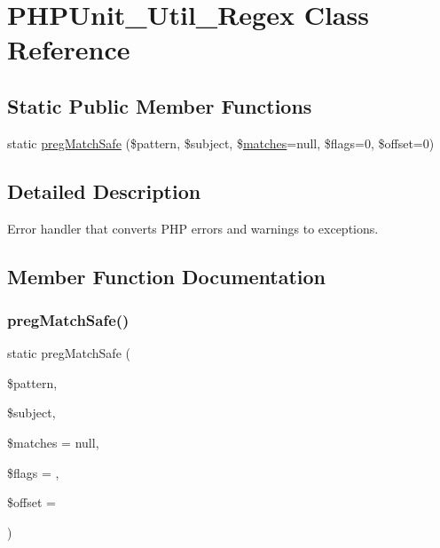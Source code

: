\hypertarget{class_p_h_p_unit___util___regex}{}\section{P\+H\+P\+Unit\+\_\+\+Util\+\_\+\+Regex Class Reference}
\label{class_p_h_p_unit___util___regex}
\subsection*{Static Public Member Functions}
\begin{DoxyCompactItemize}
\item 
static \mbox{\hyperlink{class_p_h_p_unit___util___regex_a0a93507c6a7ffbdaa77544a2077feefe}{preg\+Match\+Safe}} (\$pattern, \$subject, \$\mbox{\hyperlink{_functions_8php_a8968a55c84671473daa2233e6cae65b8}{matches}}=null, \$flags=0, \$offset=0)
\end{DoxyCompactItemize}


\subsection{Detailed Description}
Error handler that converts P\+HP errors and warnings to exceptions. 

\subsection{Member Function Documentation}
\mbox{\label{class_p_h_p_unit___util___regex_a0a93507c6a7ffbdaa77544a2077feefe}} 
\subsubsection{\texorpdfstring{preg\+Match\+Safe()}{pregMatchSafe()}}
{\footnotesize\ttfamily static preg\+Match\+Safe (\begin{DoxyParamCaption}\item[{}]{\$pattern,  }\item[{}]{\$subject,  }\item[{}]{\$matches = {\ttfamily null},  }\item[{}]{\$flags = {},  }\item[{}]{\$offset = {} }\end{DoxyParamCaption})\hspace{0.3cm}{\ttfamily [static]}}


